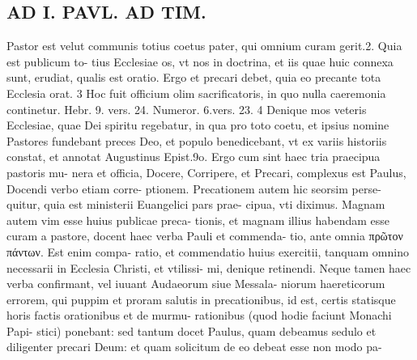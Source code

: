 \documentclass{article}
\begin{document}
\begin{pages}
\section*{AD I. PAVL. AD TIM. }
\marginpar{[ p.40 ]}\pstart Pastor est velut communis totius coetus pater, qui omnium curam gerit.2. Quia est publicum to- tius Ecclesiae os, vt nos in doctrina, et iis quae huic connexa sunt, erudiat, qualis est oratio. Ergo et precari debet, quia eo precante tota Ecclesia orat. 3 Hoc fuit officium olim sacrificatoris, in quo nulla caeremonia continetur. Hebr. 9. vers. 24. Numeror. 6.vers. 23. 4 Denique mos veteris Ecclesiae, quae Dei spiritu regebatur, in qua pro toto coetu, et ipsius nomine Pastores fundebant preces Deo, et populo benedicebant, vt ex variis historiis constat, et annotat Augustinus Epist.9o. Ergo cum sint haec tria praecipua pastoris mu- nera et officia, Docere, Corripere, et Precari, complexus est Paulus, Docendi verbo etiam corre- ptionem. Precationem autem hic seorsim perse- quitur, quia est ministerii Euangelici pars prae- cipua, vti diximus. Magnam autem vim esse huius publicae preca- tionis, et magnam illius habendam esse curam a pastore, docent haec verba Pauli et commenda- tio, ante omnia πρῶτον πάντων. Est enim compa- ratio, et commendatio huius exercitii, tanquam omnino necessarii in Ecclesia Christi, et vtilissi- mi, denique retinendi. Neque tamen haec verba confirmant, vel iuuant Audaeorum siue Messala- niorum haereticorum errorem, qui puppim et proram salutis in precationibus, id est, certis statisque horis factis orationibus et de murmu- rationibus (quod hodie faciunt Monachi Papi- stici) ponebant: sed tantum docet Paulus, quam debeamus sedulo et diligenter precari Deum: et quam solicitum de eo debeat esse non modo pa-  \pend

\end{pages}
\end{document}
